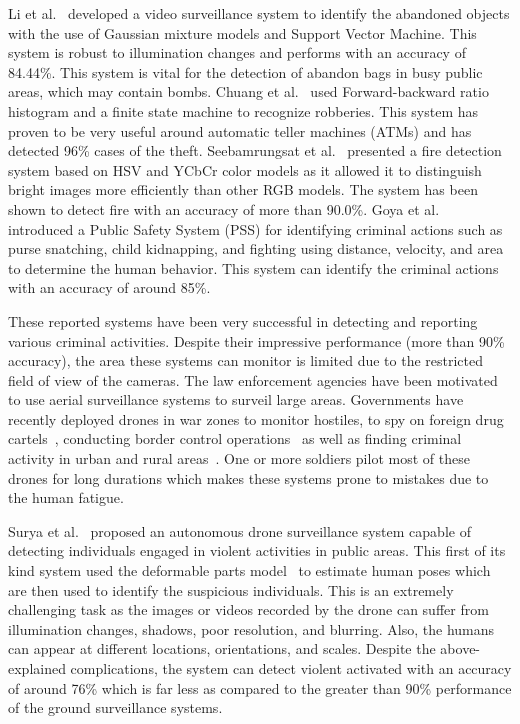 \documentclass[10pt,twocolumn,letterpaper]{article}
\begin{document}
Li et al.~\cite{li2010abandoned} developed a video surveillance system to identify the abandoned objects with the use of Gaussian mixture models and Support Vector Machine. This system is robust to illumination changes and performs with an accuracy of 84.44\%. This system is vital for the detection of abandon bags in busy public areas, which may contain bombs. Chuang et al.~\cite{chuang2009carried} used Forward-backward ratio histogram and a finite state machine to recognize robberies. This system has proven to be very useful around automatic teller machines (ATMs) and has detected 96\% cases of the theft. Seebamrungsat et al.~\cite{seebamrungsat2014fire} presented a fire detection system based on HSV and YCbCr color models as it allowed it to distinguish bright images more efficiently than other RGB models. The system has been shown to detect fire with an accuracy of more than 90.0\%. Goya et al.~\cite{goya2009method} introduced a Public Safety System (PSS) for identifying criminal actions such as purse snatching, child kidnapping, and fighting using distance, velocity, and area to determine the human behavior. This system can identify the criminal actions with an accuracy of around 85\%.

These reported systems have been very successful in detecting and reporting various criminal activities. Despite their impressive performance (more than 90\% accuracy), the area these systems can monitor is limited due to the restricted field of view of the cameras. The law enforcement agencies have been motivated to use aerial surveillance systems to surveil large areas. Governments have recently deployed drones in war zones to monitor hostiles, to spy on foreign drug cartels~\cite{ padgett2009drones}, conducting border control operations~\cite{ walters2010ucav} as well as finding criminal activity in urban and rural areas~\cite{ lewis2010cctv}. One or more soldiers pilot most of these drones for long durations which makes these systems prone to mistakes due to the human fatigue. 

Surya et al.~\cite{penmetsa2014autonomous} proposed an autonomous drone surveillance system capable of detecting individuals engaged in violent activities in public areas. This first of its kind system used the deformable parts model~\cite{felzenszwalb2005pictorial} to estimate human poses which are then used to identify the suspicious individuals. This is an extremely challenging task as the images or videos recorded by the drone can suffer from illumination changes, shadows, poor resolution, and blurring. Also, the humans can appear at different locations, orientations, and scales. Despite the above-explained complications, the system can detect violent activated with an accuracy of around 76\% which is far less as compared to the greater than 90\% performance of the ground surveillance systems.
\end{document}
